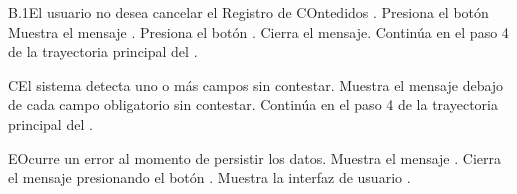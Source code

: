 \begin{UCtrayectoriaA}{B.1}{El usuario no desea cancelar el Registro de COntedidos .}
	\UCpaso[\UCactor] Presiona el botón 
	\UCpaso Muestra el mensaje .
	\UCpaso[\UCactor] Presiona el botón .
	\UCpaso Cierra el mensaje.
	\UCpaso Continúa en el paso 4 de la trayectoria principal del .
\end{UCtrayectoriaA}

\begin{UCtrayectoriaA}{C}{El sistema detecta uno o más campos sin contestar.}
	\UCpaso Muestra el mensaje  debajo de cada campo obligatorio sin contestar.
	\UCpaso Continúa en el paso 4 de la trayectoria principal del .
\end{UCtrayectoriaA}

\begin{UCtrayectoriaA}{E}{Ocurre un error al momento de persistir los datos.}
	\UCpaso Muestra el mensaje .
	\UCpaso[\UCactor] Cierra el mensaje presionando el botón .
	\UCpaso Muestra la interfaz de usuario .
\end{UCtrayectoriaA}

